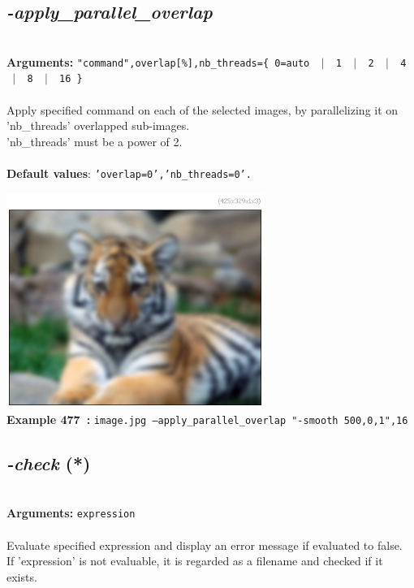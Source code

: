 \documentclass[a4paper,11pt,twoside]{book}
\begin{document}
\subsection{\emph{-apply\_parallel\_overlap} }\vspace*{-0.5em}
~\\\textbf{Arguments: } 
{\small \texttt{"command",overlap[\%],nb\_threads=\{ 0=auto ~$|$~ 1 ~$|$~ 2 ~$|$~ 4 ~$|$~ 8 ~$|$~ 16 \}}}\\~\\
Apply specified command on each of the selected images, by parallelizing it on 'nb\_threads' overlapped sub-images.
~\\'nb\_threads' must be a power of 2.
~\\~\\\textbf{Default values}: {\small \texttt{'overlap=0','nb\_threads=0'.}}
\begin{center}\includegraphics[keepaspectratio=true,height=7cm,width=\textwidth]{img/gmic_def477.jpg}\\
{\footnotesize \textbf{Example 477~:} \texttt{image.jpg --apply\_parallel\_overlap "-smooth 500,0,1",16}}
\end{center}

\subsection{\emph{-check} (*)}\vspace*{-0.5em}
~\\\textbf{Arguments: } 
{\small \texttt{expression}}\\~\\
Evaluate specified expression and display an error message if evaluated to false.
~\\If 'expression' is not evaluable, it is regarded as a filename and checked if it exists.
\end{document}
